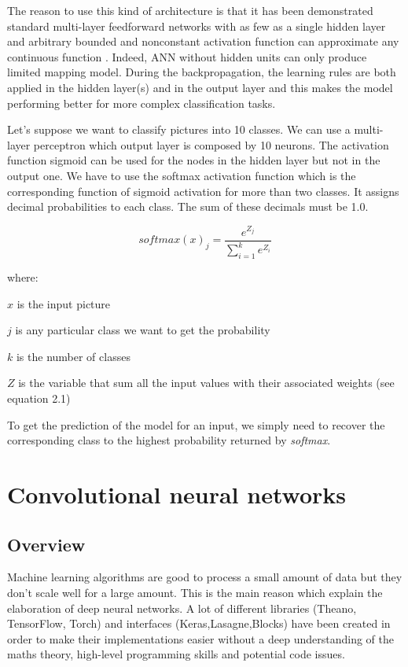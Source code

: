 The reason to use this kind of architecture is that it has been demonstrated standard multi-layer feedforward networks with as few as a single hidden layer and arbitrary bounded and nonconstant activation function can approximate any continuous function \cite{multi}.
Indeed, ANN without hidden units can only produce limited mapping model. During the backpropagation, the learning rules are both applied in the hidden layer(s) and in the output layer and this makes the model performing better for more complex classification tasks.

Let's suppose we want to classify pictures into 10 classes. We can use a multi-layer perceptron which output layer is composed by 10 neurons. The activation function sigmoid can be used for the nodes in the hidden layer but not in the output one. We have to use the softmax activation function which is the corresponding function of sigmoid activation for more than two classes. It assigns decimal probabilities to each class. The sum of these decimals must be 1.0. 

\begin{equation}
{softmax(x)_{j}}=\frac{e^{{Z}_{j}}}{\sum_{i=1}^k e^{Z_{i}} }
\end{equation}

where:

${x}$ is the input picture

${j}$ is any particular class we want to get the probability

${k}$ is the number of classes

${Z}$ is the variable that sum all the input values with their associated weights (see equation 2.1) 

To get the prediction of the model for an input, we simply need to recover the corresponding class to the highest probability returned by \emph{softmax}.

 

\section{Convolutional neural networks}
\subsection{Overview}
Machine learning algorithms are good to process a small amount of data but they don't scale well for a large amount. This is the main reason which explain the elaboration of deep neural networks. A lot of different libraries (Theano, TensorFlow, Torch) and interfaces (Keras,Lasagne,Blocks) have been created in order to make their implementations easier without a deep understanding of the maths theory, high-level programming skills and potential code issues. 

